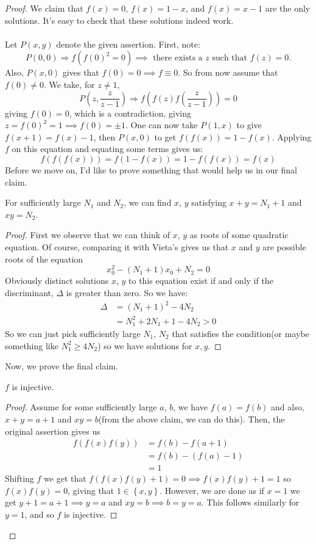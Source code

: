 \documentclass[11pt]{scrartcl}
\begin{document}
\begin{proof}
  We claim that $f(x) = 0$, $f(x) = 1-x$, and $f(x) = x-1$ are the only solutions. It's easy to check that these solutions indeed work.
  \\ \\
  Let $P(x,y)$ denote the given assertion. First, note:
  \[
  P(0,0) \Longrightarrow f(f(0)^2 = 0) \implies \text{ there exists a } z \text{ such that } f(z) = 0.
  \]
  Also, $P(x, 0)$ gives that $f(0)=0 \implies f \equiv 0$. So from now assume that $f(0) \neq 0$. We take, for $z\neq1$,
  \[
  P\left(z, \frac{z}{z-1}\right) \Longrightarrow f\left(f(z)f\left(\frac{z}{z-1}\right)\right) = 0
  \]
  giving $f(0)=0$, which is a contradiction, giving $z=f(0)^2=1 \implies f(0) = \pm 1$. One can now take
  $P(1,x)$ to give $f(x+1) = f(x)-1$, then $P(x,0)$ to get $f(f(x)) = 1-f(x)$. Applying $f$ on this equation and equating
  some terms gives us:
  \[
  f(f(f(x))) = f(1-f(x)) = 1-f(f(x)) = f(x)
  \]
  Before we move on, I'd like to prove something that would help us in our final claim.
  \begin{claim}
    For sufficiently large $N_1$ and $N_2$, we can find $x$, $y$ satisfying $x+y = N_1 + 1$ and $xy = N_2$.
  \end{claim}
  \begin{proof}
    First we observe that we can think of $x$, $y$ as roots of some quadratic equation. Of course, comparing it with Vieta's gives us that
    $x$ and $y$ are possible roots of the equation
    \[
    x_0^2 - (N_1 + 1)x_0 + N_2 = 0
    \]
    Obviously distinct solutions $x$, $y$ to this equation exist if and only if the discriminant, $\Delta$ is greater than zero. So we have:
    \begin{align*}
    \Delta &= (N_1+1)^2 - 4N_2 \\
    &= N_1^2 + 2N_1 + 1 - 4N_2 > 0
    \end{align*}
    So we can just pick sufficiently large $N_1$, $N_2$ that satisfies the condition(or maybe something like $N_1^2 \ge 4N_2$) so we have 
    solutions for $x, y$.
  \end{proof}

  Now, we prove the final claim.

  \begin{claim}
    $f$ is injective.
  \end{claim}
  \begin{proof}
    Assume for some sufficiently large $a$, $b$, we have $f(a) = f(b)$ and also, $x+y = a+1$ and $xy = b$(from the above claim, we can do this).
    Then, the original assertion gives us
    \begin{align*}
      f(f(x)f(y)) &= f(b) - f(a+1) \\
      &= f(b) - (f(a) - 1) \\
      &= 1
    \end{align*}
    Shifting $f$ we get that $f(f(x)f(y)+1) = 0 \implies f(x)f(y) + 1 = 1$ so $f(x)f(y) = 0$, giving that $1 \in \left\{ x, y \right\}$. However,
    we are done as if $x=1$ we get $y+1=a+1 \implies y=a$ and $xy=b \implies b=y=a$. This follows similarly for $y=1$, and so $f$ is injective.
  \end{proof}


\end{proof}
\end{document}
